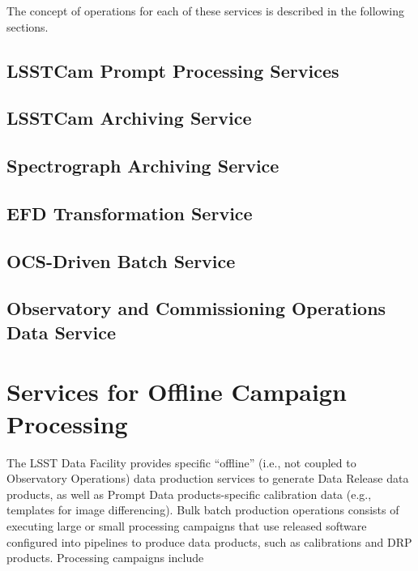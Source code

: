 The concept of operations for each of these services is described in the
following sections.

\subsection{LSSTCam Prompt Processing Services}


\subsection{LSSTCam Archiving Service}


\subsection{Spectrograph Archiving Service}


\subsection{EFD Transformation Service}


\subsection{OCS-Driven Batch Service}


\subsection{Observatory and Commissioning Operations Data Service}


\section{Services for Offline Campaign Processing}

The LSST Data Facility provides specific “offline” (i.e., not coupled to
Observatory Operations) data production services to generate Data Release data
products, as well as Prompt Data products-specific calibration data (e.g., templates for
image differencing). Bulk batch production operations consists of executing
large or small processing campaigns that use released software configured into
pipelines to produce data products, such as calibrations and DRP products.
Processing campaigns include

